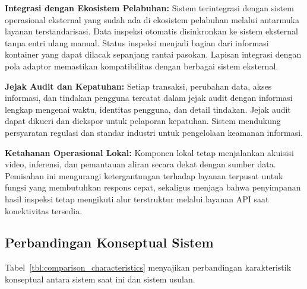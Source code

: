 \textbf{Integrasi dengan Ekosistem Pelabuhan:}
Sistem terintegrasi dengan sistem operasional eksternal yang sudah ada di ekosistem pelabuhan melalui antarmuka layanan terstandarisasi. Data inspeksi otomatis disinkronkan ke sistem eksternal tanpa entri ulang manual. Status inspeksi menjadi bagian dari informasi kontainer yang dapat dilacak sepanjang rantai pasokan. Lapisan integrasi dengan pola adaptor memastikan kompatibilitas dengan berbagai sistem eksternal.

\textbf{Jejak Audit dan Kepatuhan:}
Setiap transaksi, perubahan data, akses informasi, dan tindakan pengguna tercatat dalam jejak audit dengan informasi lengkap mengenai waktu, identitas pengguna, dan detail tindakan. Jejak audit dapat dikueri dan diekspor untuk pelaporan kepatuhan. Sistem mendukung persyaratan regulasi dan standar industri untuk pengelolaan keamanan informasi.

\textbf{Ketahanan Operasional Lokal:}
Komponen lokal tetap menjalankan akuisisi video, inferensi, dan pemantauan aliran secara dekat dengan sumber data. Pemisahan ini mengurangi ketergantungan terhadap layanan terpusat untuk fungsi yang membutuhkan respons cepat, sekaligus menjaga bahwa penyimpanan hasil inspeksi tetap mengikuti alur terstruktur melalui layanan API saat konektivitas tersedia.

\subsection{Perbandingan Konseptual Sistem}
\label{subsec:perbandingan-komprehensif}

Tabel~\ref{tbl:comparison_characteristics} menyajikan perbandingan karakteristik konseptual antara sistem saat ini dan sistem usulan.

